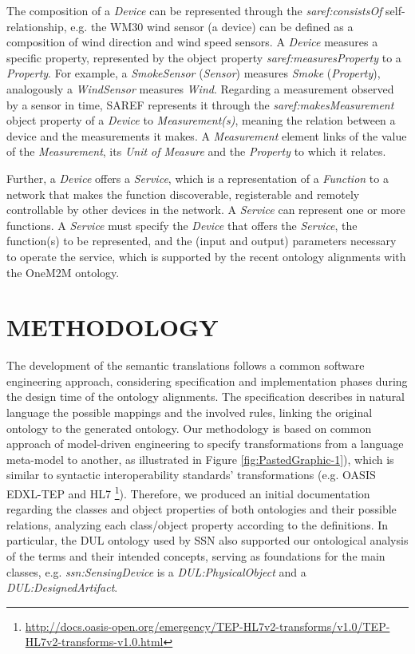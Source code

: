 \documentclass{sig-alternate-05-2015}
\begin{document}
The composition of a \textit{Device} can be represented through the \textit{saref:\-consistsOf} self-relationship, e.g. the WM30 wind sensor (a device) can be defined as a composition of wind direction and wind speed sensors. A \textit{Device} measures a specific property, represented by the object property \textit{saref:\-measuresProperty} to a \textit{Property}. For example, a \textit{SmokeSensor} (\textit{Sensor}) measures \textit{Smoke} (\textit{Property}), analogously a \textit{WindSensor} measures \textit{Wind}. Regarding a measurement observed by a sensor in time, SAREF represents it through the \textit{saref:\-makesMeasurement} object property of a \textit{Device} to \textit{Measurement(s)}, meaning the relation between a device and the measurements it makes. A \textit{Measurement} element links of the value of the \textit{Measurement}, its \textit{Unit of Measure} and the \textit{Property} to which it relates. 

Further, a \textit{Device} offers a \textit{Service}, which is a representation of a \textit{Function} to a network that makes the function discoverable, registerable and remotely controllable by other devices in the network. A \textit{Service} can represent one or more functions. A \textit{Service} must specify the \textit{Device} that offers the \textit{Service}, the function(s) to be represented, and the (input and output) parameters necessary to operate the service, which is supported by the recent ontology alignments with the OneM2M ontology. 


\section{METHODOLOGY}
The development of the semantic translations follows a common software engineering approach, considering specification and implementation phases during the design time of the ontology alignments. The specification describes in natural language the possible mappings and the involved rules, linking the original ontology to the generated ontology. Our methodology is based on common approach of model-driven engineering to specify transformations from a language meta-model to another, as illustrated in Figure \ref{fig:PastedGraphic-1}), which is similar to syntactic interoperability standards' transformations (e.g. OASIS EDXL-TEP and HL7 \footnote{\url{http://docs.oasis-open.org/emergency/TEP-HL7v2-transforms/v1.0/TEP-HL7v2-transforms-v1.0.html}}). Therefore, we produced an initial documentation regarding the classes and object properties of both ontologies and their possible relations, analyzing each class/object property according to the definitions. In particular, the DUL ontology used by SSN also supported our ontological analysis of the terms and their intended concepts, serving as foundations for the main classes, e.g. \textit{ssn:\-SensingDevice} is a \textit{DUL:PhysicalObject} and a \textit{DUL:\-Designed\-Artifact}.
\end{document}
